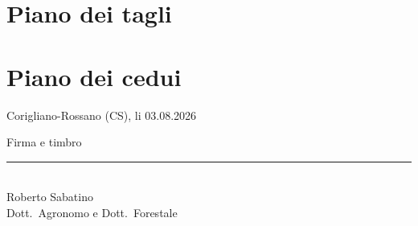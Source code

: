 \documentclass[a4paper,11pt]{article}
\newif\ifincludesections \includesectionstrue
\newcommand{\maybeinput}[1]{\ifincludesections  \fi}
\newcommand{\pubdate}{03.08.2026}
\begin{document}
\clearpage
\section{Piano dei tagli}
\label{sec:piano}


\clearpage
\section{Piano dei cedui}
\label{sec:ceduo}


\maybeinput{sec-particelle}

\clearpage
\thispagestyle{empty}
\vspace*{\fill}

\noindent Corigliano-Rossano (CS), li \pubdate

\vspace{2cm}

\noindent Firma e timbro

\vspace{2.5cm}

\noindent\rule{7cm}{0.4pt}\\
Roberto Sabatino\\
Dott.\ Agronomo e Dott.\ Forestale

\vspace{3cm}

\clearpage
\printbibliography
\end{document}
